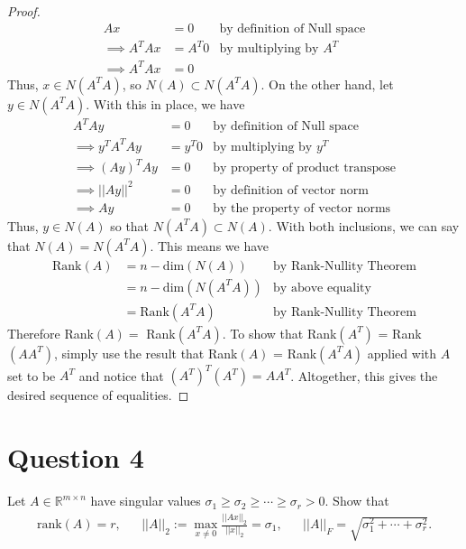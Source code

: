 \documentclass[10pt,a4paper]{article}
\theoremstyle{definition}
\theoremstyle{definition}
\numberwithin{equation}{section}
\begin{document}
\begin{proof}
\begin{align*}
Ax &= 0 &\text{by definition of Null space}\\
\implies A^TAx &= A^T0 &\text{by multiplying by $A^T$}\\
\implies A^TAx &= 0
\end{align*}
Thus, $x \in N(A^TA)$, so $N(A) \subset N(A^TA)$. On the other hand, let $y \in N(A^TA)$. With this in place, we have
\begin{align*}
A^TAy &= 0 &\text{by definition of Null space}\\
\implies y^TA^TAy &= y^T0 &\text{by multiplying by $y^T$}\\
\implies (Ay)^T Ay &= 0 &\text{by property of product transpose}\\
\implies ||Ay||^2 &= 0 &\text{by definition of vector norm}\\
\implies Ay &= 0 &\text{by the property of vector norms}
\end{align*}
Thus, $y \in N(A)$ so that $N(A^TA) \subset N(A)$. With both inclusions, we can say that $N(A) = N(A^T A)$. This means we have
\begin{align*}
\text{Rank}(A) &= n - \text{dim}(N(A)) &\text{by Rank-Nullity Theorem}\\
&= n - \text{dim}(N(A^TA)) &\text{by above equality}\\
&= \text{Rank}(A^TA) &\text{by Rank-Nullity Theorem}
\end{align*}
Therefore Rank$(A) = $ Rank$(A^TA)$. To show that Rank$(A^T)$ = Rank$(AA^T)$, simply use the result that Rank$(A)$ = Rank$(A^TA)$ applied with $A$ set to be $A^T$ and notice that $(A^T)^T(A^T) = AA^T$. Altogether, this gives the desired sequence of equalities. 
\end{proof}

\section*{Question 4}
Let $A \in \mathbb{R}^{m \times n}$ have singular values $\sigma_1 \geq \sigma_2 \geq \cdots \geq \sigma_r > 0$. Show that 
\begin{align*}
\text{rank}(A) = r, && ||A||_2 := \max_{x \neq 0} \frac{||Ax||_2}{||x||_2} = \sigma_1, && ||A||_F = \sqrt{\sigma_1^2 + \cdots + \sigma_r^2}.
\end{align*}
\end{document}
